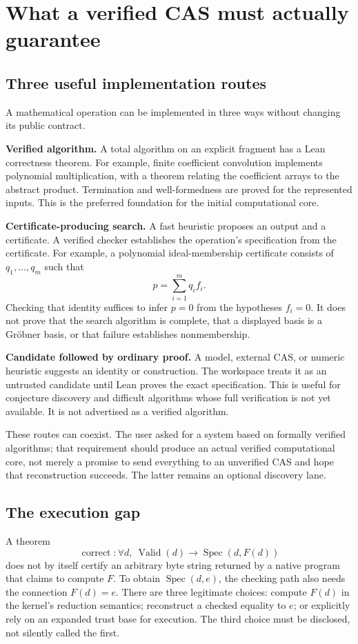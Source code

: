 \documentclass[11pt,letterpaper]{article}
\newcommand{\Valid}{\operatorname{Valid}}
\newcommand{\Spec}{\operatorname{Spec}}
\numberwithin{equation}{section}
\begin{document}
\section{What a verified CAS must actually guarantee}\label{sec:cas}
\subsection{Three useful implementation routes}
A mathematical operation can be implemented in three ways without changing its
public contract.

\textbf{Verified algorithm.} A total algorithm on an explicit fragment has a
Lean correctness theorem. For example, finite coefficient convolution implements
polynomial multiplication, with a theorem relating the coefficient arrays to the
abstract product. Termination and well-formedness are proved for the represented
inputs. This is the preferred foundation for the initial computational core.

\textbf{Certificate-producing search.} A fast heuristic proposes an output and a
certificate. A verified checker establishes the operation's specification from
the certificate. For example, a polynomial ideal-membership certificate consists
of $q_1,\ldots,q_m$ such that
\[
 p=\sum_{i=1}^m q_i f_i.
\]
Checking that identity suffices to infer $p=0$ from the hypotheses $f_i=0$.
It does not prove that the search algorithm is complete, that a displayed basis
is a Gr\"obner basis, or that failure establishes nonmembership.

\textbf{Candidate followed by ordinary proof.} A model, external CAS, or numeric
heuristic suggests an identity or construction. The workspace treats it as an
untrusted candidate until Lean proves the exact specification. This is useful
for conjecture discovery and difficult algorithms whose full verification is not
yet available. It is not advertised as a verified algorithm.

These routes can coexist. The user asked for a system based on formally verified
algorithms; that requirement should produce an actual verified computational
core, not merely a promise to send everything to an unverified CAS and hope that
reconstruction succeeds. The latter remains an optional discovery lane.

\subsection{The execution gap}
A theorem
\[
 \operatorname{correct}:\forall d,\ \Valid(d)\to\Spec(d,F(d))
\]
does not by itself certify an arbitrary byte string returned by a native program
that claims to compute $F$. To obtain $\Spec(d,e)$, the checking path also needs
the connection $F(d)=e$. There are three legitimate choices: compute $F(d)$ in
the kernel's reduction semantics; reconstruct a checked equality to $e$; or
explicitly rely on an expanded trust base for execution. The third choice must
be disclosed, not silently called the first.
\end{document}
